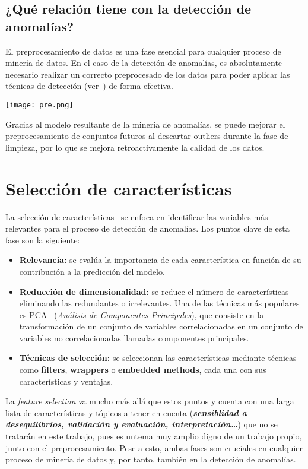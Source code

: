 \subsection{¿Qué relación tiene con la detección de anomalías?}
El preprocesamiento de datos es una fase esencial para cualquier proceso de minería de datos. En
el caso de la detección de anomalías, es absolutamente necesario realizar un correcto preprocesado
de los datos para poder aplicar las técnicas de detección (ver~) de forma
efectiva.~\cite{ramirez2022cleaning}

\noindent
\begin{minipage}{\linewidth}
	\centering
	\texttt{[image: pre.png]}
	\label{fig:fig3}
\end{minipage}

Gracias al modelo resultante de la minería de anomalías, se puede mejorar el preprocesamiento de
conjuntos futuros al descartar outliers durante la fase de limpieza, por lo que se mejora
retroactivamente la calidad de los datos.

\section{Selección de características}\label{sec:feat}
La selección de características~\cite{guyon2003introduction} se enfoca en identificar las variables más relevantes para el
proceso de detección de anomalías. Los puntos clave de esta fase son la siguiente:

\begin{itemize}
	\item \textbf{Relevancia:} se evalúa la importancia de cada característica en
		función de su contribución a la predicción del modelo.
	\item \textbf{Reducción de dimensionalidad:} se reduce el número de características
		eliminando las redundantes o irrelevantes. Una de las técnicas más populares es
		PCA~\cite{wold1987principal} (\textit{Análisis de Componentes Principales}), que
		consiste en la transformación de un conjunto de variables correlacionadas en un
		conjunto de variables no correlacionadas llamadas componentes principales.
	\item \textbf{Técnicas de selección:} se seleccionan las características mediante
		técnicas como \textbf{filters}, \textbf{wrappers} o \textbf{embedded methods},
		cada una con sus características y ventajas.
\end{itemize}

La \textit{feature selection} va mucho más allá que estos puntos y cuenta con una larga lista de
características y tópicos a tener en cuenta (\textit{\textbf{sensiblidad a desequilibrios, validación
y evaluación, interpretación\ldots}}) que no se tratarán en este trabajo, pues es untema muy
amplio digno de un trabajo propio, junto con el preprocesamiento. Pese a esto, ambas fases son
cruciales en cualquier proceso de minería de datos y, por tanto, también en la detección de anomalías.
